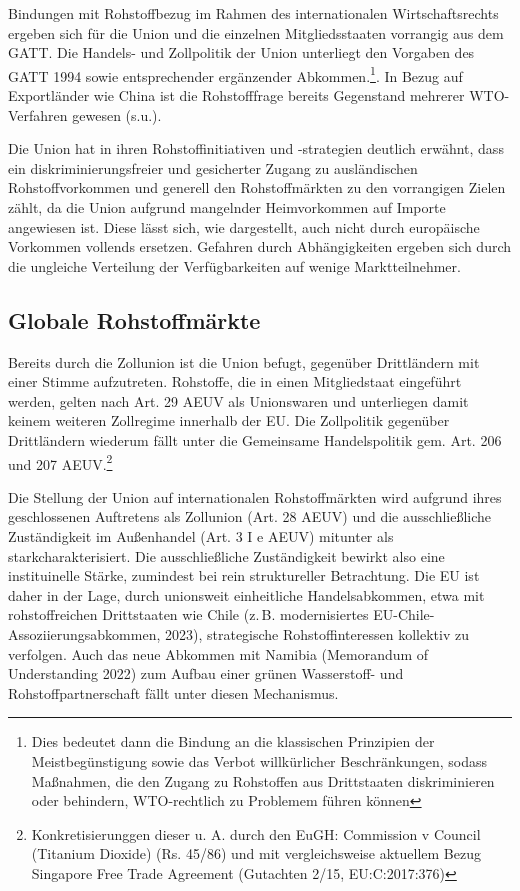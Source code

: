 \documentclass[12pt,a4paper,oneside]{book} %
\begin{document}
Bindungen mit Rohstoffbezug im Rahmen des internationalen Wirtschaftsrechts ergeben sich für die Union und die einzelnen Mitgliedsstaaten vorrangig aus dem GATT. Die Handels- und Zollpolitik der Union unterliegt den Vorgaben des GATT 1994 sowie entsprechender ergänzender Abkommen.\footnote{Dies bedeutet dann die Bindung an die klassischen Prinzipien der Meistbegünstigung sowie das Verbot willkürlicher Beschränkungen, sodass Maßnahmen, die den Zugang zu Rohstoffen aus Drittstaaten diskriminieren oder behindern, WTO-rechtlich zu Problemem führen können}. In Bezug auf Exportländer wie China ist die Rohstofffrage bereits Gegenstand mehrerer WTO-Verfahren gewesen (s.u.).

Die Union hat in ihren Rohstoffinitiativen und -strategien deutlich erwähnt, dass ein diskriminierungsfreier und gesicherter Zugang zu ausländischen Rohstoffvorkommen und generell den Rohstoffmärkten zu den vorrangigen Zielen zählt, da die Union aufgrund mangelnder Heimvorkommen auf Importe angewiesen ist. Diese lässt sich, wie dargestellt, auch nicht durch europäische Vorkommen vollends ersetzen. Gefahren durch Abhängigkeiten ergeben sich durch die ungleiche Verteilung der Verfügbarkeiten auf wenige Marktteilnehmer.

\subsection{Globale Rohstoffmärkte}

Bereits durch die Zollunion ist die Union befugt, gegenüber Drittländern mit einer Stimme aufzutreten. Rohstoffe, die in einen Mitgliedstaat eingeführt werden, gelten nach Art. 29 AEUV als Unionswaren und unterliegen damit keinem weiteren Zollregime innerhalb der EU. Die Zollpolitik gegenüber Drittländern wiederum fällt unter die Gemeinsame Handelspolitik gem. Art. 206 und 207 AEUV.\footnote{Konkretisierunggen dieser u. A. durch den EuGH: Commission v Council (Titanium Dioxide) (Rs. 45/86) und mit vergleichsweise aktuellem Bezug Singapore Free Trade Agreement (Gutachten 2/15, EU:C:2017:376)}

Die Stellung der Union auf internationalen Rohstoffmärkten wird aufgrund ihres geschlossenen Auftretens als Zollunion (Art. 28 AEUV) und die ausschließliche Zuständigkeit im Außenhandel (Art. 3 I e AEUV) mitunter als \glqq stark\grqq charakterisiert.\autocite{Schorkopf, Rohstoffverwaltung, Rn. 34.} Die ausschließliche Zuständigkeit bewirkt also eine instituinelle Stärke, zumindest bei rein struktureller Betrachtung. Die EU ist daher in der Lage, durch unionsweit einheitliche Handelsabkommen, etwa mit rohstoffreichen Drittstaaten wie Chile (z. B. modernisiertes EU-Chile-Assoziierungsabkommen, 2023), strategische Rohstoffinteressen kollektiv zu verfolgen. Auch das neue Abkommen mit Namibia (Memorandum of Understanding 2022) zum Aufbau einer grünen Wasserstoff- und Rohstoffpartnerschaft fällt unter diesen Mechanismus.
\end{document}
